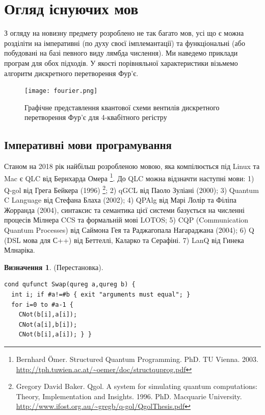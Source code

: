 \documentclass{article}
\theoremstyle{definition}
\newtheorem{definition}{Визначення}
\begin{document}
\newpage
\section{Огляд існуючих мов}
З огляду на новизну предмету розроблено не так багато мов, усі що є можна розділіти
на імперативні (по духу своєї імплемантації) та функціональні (або побудовані на базі певного виду
лямбда числення). Ми наведемо приклади програм для обох підходів.
У якості порівняльної характеристики візьмемо алгоритм дискретного перетворення Фур'є.

\begin{figure}[h]
  \centerline{\texttt{[image: fourier.png]}}
  \caption{Графічне представлення квантової схеми вентилів дискретного перетворення Фур'є для 4-квабітного регістру}
\end{figure}

\newpage
\subsection{Імперативні мови програмування}
Станом на 2018 рік найбільш розробленою мовою, яка компілюється під Linux та Mac
є QLC від Бернхарда Омера
\footnote{Bernhard Ömer. Structured Quantum Programming. PhD. TU Vienna. 2003.
          \url{http://tph.tuwien.ac.at/~oemer/doc/structquprog.pdf}}.
До QLC можна відзначти наступні мови:
1) Q-gol від Грега Бейкера (1996)
   \footnote{Gregory David Baker.
             Qgol. A system for simulating quantum computations:
             Theory, Implementation and Insights. 1996. PhD. Macquarie University. \\
             \url{http://www.ifost.org.au/~gregb/q-gol/QgolThesis.pdf}};
2) qGCL від Паоло Зуліані (2000)\cite{Sanders2000};
3) Quantum C Language від Стефана Блаха (2002);
4) QPAlg від Марі Лолір та Філіпа Жорранда (2004)\cite{Lalire2004}, синтаксис та семантика цієї системи базується на численні процесів Мілнера CCS та формальній мові LOTOS;
5) CQP (Communication Quantum Processes) від Саймона Гея та Раджагопала Нагараджана (2004)\cite{Gay2005};
6) Q (DSL мова для С++) від Беттеллі, Каларко та Серафіні\cite{}.
7) LanQ від Гинека Млнаріка\cite{Mlnarik2007}.

\begin{definition} (Перестановка).
\begin{lstlisting}
cond qufunct Swap(qureg a,qureg b) {
  int i; if #a!=#b { exit "arguments must equal"; }
  for i=0 to #a-1 {
    CNot(b[i],a[i]);
    CNot(a[i],b[i]);
    CNot(b[i],a[i]); } }
\end{lstlisting}
\end{definition}
\end{document}
